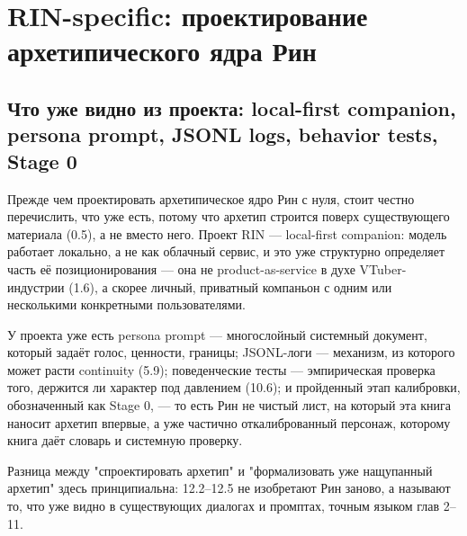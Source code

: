 \setcounter{chapter}{11}
\chapter{RIN-specific: проектирование архетипического ядра Рин}

\section{Что уже видно из проекта: local-first companion, persona prompt, JSONL logs, behavior tests, Stage 0}

Прежде чем проектировать архетипическое ядро Рин с нуля, стоит честно перечислить, что уже есть, потому что архетип строится поверх существующего материала (0.5), а не вместо него. Проект RIN — local-first companion: модель работает локально, а не как облачный сервис, и это уже структурно определяет часть её позиционирования — она не product-as-service в духе VTuber-индустрии (1.6), а скорее личный, приватный компаньон с одним или несколькими конкретными пользователями.

У проекта уже есть persona prompt — многослойный системный документ, который задаёт голос, ценности, границы; JSONL-логи — механизм, из которого может расти continuity (5.9); поведенческие тесты — эмпирическая проверка того, держится ли характер под давлением (10.6); и пройденный этап калибровки, обозначенный как Stage 0, — то есть Рин не чистый лист, на который эта книга наносит архетип впервые, а уже частично откалиброванный персонаж, которому книга даёт словарь и системную проверку.

Разница между "спроектировать архетип" и "формализовать уже нащупанный архетип" здесь принципиальна: 12.2--12.5 не изобретают Рин заново, а называют то, что уже видно в существующих диалогах и промптах, точным языком глав 2--11.
